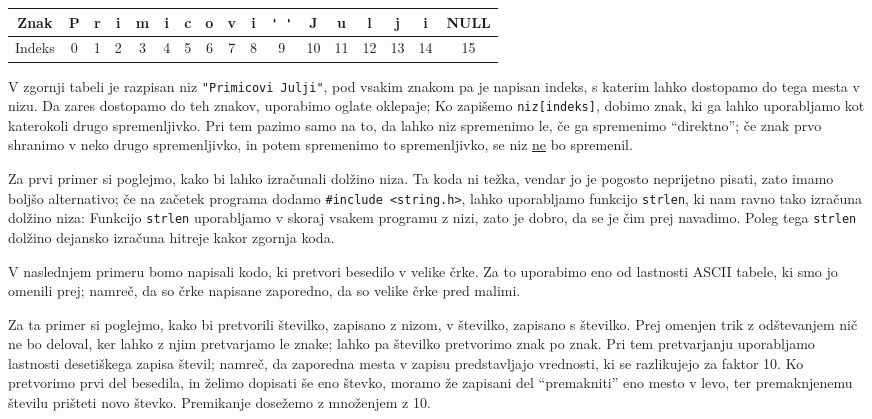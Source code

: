 \vspace{0.5cm}

\begin{tabular}[h!]{|c|cccccccccccccccc|}
  Znak & P & r & i & m & i & c & o & v & i & \verb+' '+  & J & u & l & j & i & NULL \\
  \hline
  Indeks & 0 & 1 & 2 & 3 & 4 & 5 & 6 & 7 & 8 & 9 & 10 & 11 & 12 & 13 & 14 & 15 \\
\end{tabular}

\vspace{0.5cm}

V zgornji tabeli je razpisan niz \verb+"Primicovi Julji"+, pod vsakim znakom pa
je napisan indeks, s katerim lahko dostopamo do tega mesta v nizu.
Da zares dostopamo do teh znakov, uporabimo oglate oklepaje;
Ko zapišemo \verb+niz[indeks]+, dobimo znak, ki ga lahko uporabljamo kot
katerokoli drugo spremenljivko.
Pri tem pazimo samo na to, da lahko niz spremenimo le, če ga spremenimo
``direktno''; če znak prvo shranimo v neko drugo spremenljivko, in potem
spremenimo to spremenljivko, se niz \underline{ne} bo spremenil.

\begin{examples}
  Za prvi primer si poglejmo, kako bi lahko izračunali dolžino niza.
  Ta koda ni težka, vendar jo je pogosto neprijetno pisati, zato imamo boljšo
  alternativo; če na začetek programa dodamo \verb+#include <string.h>+, lahko
  uporabljamo funkcijo \verb+strlen+, ki nam ravno tako izračuna dolžino niza:
  Funkcijo \verb+strlen+ uporabljamo v skoraj vsakem programu z nizi, zato je
  dobro, da se je čim prej navadimo.
  Poleg tega \verb+strlen+ dolžino dejansko izračuna hitreje kakor zgornja koda.
\end{examples}

\begin{examples}
  V naslednjem primeru bomo napisali kodo, ki pretvori besedilo v velike črke.
  Za to uporabimo eno od lastnosti ASCII tabele, ki smo jo omenili prej; namreč,
  da so črke napisane zaporedno, da so velike črke pred malimi.
\end{examples}

\begin{examples}
  Za ta primer si poglejmo, kako bi pretvorili številko, zapisano z nizom, v
  številko, zapisano s številko.
  Prej omenjen trik z odštevanjem nič ne bo deloval, ker lahko z njim
  pretvarjamo le znake; lahko pa številko pretvorimo znak po znak.
  Pri tem pretvarjanju uporabljamo lastnosti desetiškega zapisa števil; namreč,
  da zaporedna mesta v zapisu predstavljajo vrednosti, ki se razlikujejo za
  faktor 10.
  Ko pretvorimo prvi del besedila, in želimo dopisati še eno števko, moramo že
  zapisani del ``premakniti'' eno mesto v levo, ter premaknjenemu številu
  prišteti novo števko.
  Premikanje dosežemo z množenjem z 10.
\end{examples}

